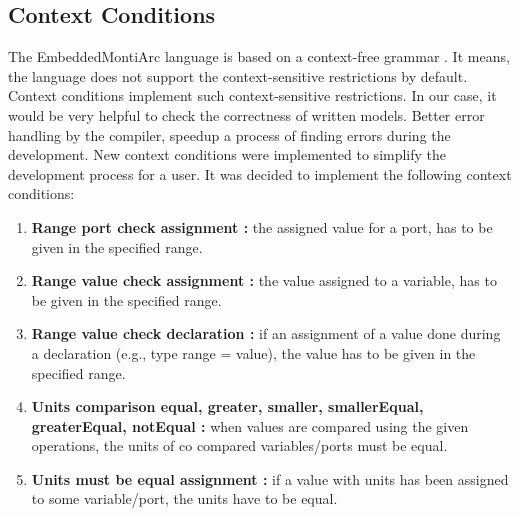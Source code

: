 \subsection{Context Conditions}
The EmbeddedMontiArc language is based on a context-free grammar \cite{bundy1984context}. It means, the language does not support the context-sensitive restrictions by default. Context conditions implement such context-sensitive restrictions. In our case, it would be very helpful to check the correctness of written models. Better error handling by the compiler, speedup a process of finding errors during the development. New context conditions were implemented to simplify the development process for a user. It was decided to implement the following context conditions:
\begin{enumerate}
    \item \textbf{Range port check assignment :} the assigned value for a port, has to be given in the specified range.
    \item \textbf{Range value check assignment :} the value assigned to a variable, has to be given in the specified range.
    \item \textbf{Range value check declaration :} if an assignment of a value done during a declaration (e.g., type range = value), the value has to be given in the specified range.
    \item \textbf{Units comparison equal, greater, smaller, smallerEqual, greaterEqual, notEqual :} when values are compared using the given operations, the units of co compared variables/ports must be equal.
    \item \textbf{Units must be equal assignment :} if a value with units has been assigned to some variable/port, the units have to be equal.  
\end{enumerate}
